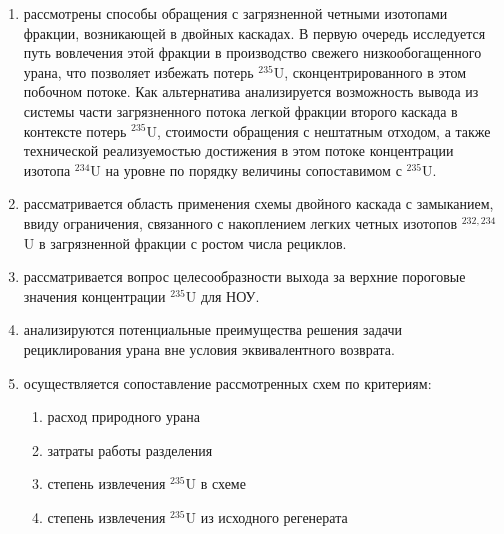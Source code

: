 \begin{enumerate}
  \item рассмотрены способы обращения с загрязненной четными изотопами фракции, возникающей в двойных каскадах. В первую очередь исследуется путь вовлечения этой фракции в производство свежего низкообогащенного урана, что позволяет избежать потерь $^{235}$U, сконцентрированного в этом побочном потоке. Как альтернатива анализируется возможность вывода из системы части загрязненного потока легкой фракции второго каскада в контексте потерь $^{235}$U, стоимости обращения с нештатным отходом, а также технической реализуемостью достижения в этом потоке концентрации изотопа $^{234}$U на уровне по порядку величины сопоставимом с $^{235}$U.
  \item рассматривается область применения схемы двойного каскада с замыканием, ввиду ограничения, связанного с накоплением легких четных изотопов $^{232,234}$U в загрязненной фракции с ростом числа рециклов.
  \item рассматривается вопрос целесообразности выхода за верхние пороговые значения концентрации $^{235}$U для НОУ.
  \item анализируются потенциальные преимущества решения задачи рециклирования урана вне условия эквивалентного возврата.
  \item осуществляется сопоставление рассмотренных схем по критериям:
  \begin{enumerate}
    \item расход природного урана
    \item затраты работы разделения
    \item степень извлечения $^{235}$U в схеме
    \item степень извлечения $^{235}$U из исходного регенерата
  \end{enumerate}  
\end{enumerate}

